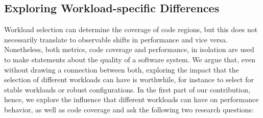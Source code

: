 \begin{comment}
Performance models are often learned from observations under a single workload. While the implications of potential bias have been described to some extent in related work, we want to revisit these with an introductory example in Listing~\ref{lst:intro}. The Python method computes a dictionary of word frequencies in a given file and can write results to or retrieve results from a cache, which is enabled by a configuration option. The three highlighted code sections depend on the selection of the caching option, the workload size, or both: The first part will increase execution time if the target file has already been cached, the second part will only be executed for files that contains more than 1024 characters, and the last part will cache a large file for later re-use to save on execution time. That is, depending on the workload and configuration, one can expect different performance behavior. 


\begin{lstlisting}[caption={fgf},label=lst:intro, escapechar=\%,float]
CACHING = parse_options()
	
def calc_word_frequency(self, path: String)
	workload = open(path, 'r').read()
	workload_size = len(workload)
	frequencies = dict()
	
	# option-dependent
	if CACHING and path in self.cache:
%\cova%		return self.cache[path]}
	
	# workload-dependent
	if workload_size > 1024:	
%\covb%		for word in workload.split(' '):
%\covb%			if word not in frequencies: 
%\covb%				frequencies[word] = 0
%\covb%			frequencies[word] += 1
	
	# option- and workload-dependent
	if CACHING and workload_size > 65536:
%\covc%		self.cache[path] = frequencies
	
	return frequencies
\end{lstlisting}
\end{comment}

\subsection{Exploring Workload-specific Differences}
Workload selection can determine the coverage of code regions, but this does not necessarily translate to observable shifts in performance and vice versa. Nonetheless, both metrics, code coverage and performance, in isolation are used to make statements about the quality of a software system. We argue that, even without drawing a connection between both, exploring the impact that the selection of different workloads can have is worthwhile, for instance to select for stable workloads or robust configurations.
In the first part of our contribution, hence, we explore the influence that different workloads can have on performance behavior, as well as code coverage and ask the following two research questions:


